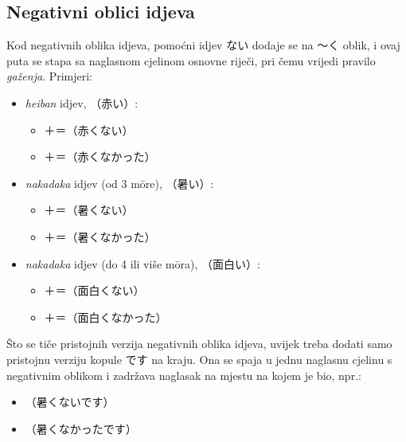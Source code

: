 \subsection{Negativni oblici idjeva}
Kod negativnih oblika idjeva, pomoćni idjev ない dodaje se na 〜く oblik, i ovaj puta se stapa sa naglasnom cjelinom osnovne riječi, pri čemu vrijedi pravilo \textit{gaženja}.
Primjeri:
\begin{itemize}
	\item \textit{heiban} idjev, （赤い）:
	\begin{itemize}
		\item {}＋＝（赤くない）
		\item {}＋＝（赤くなかった）
	\end{itemize}
	\item \textit{nakadaka} idjev (od 3 m\=ore), （暑い）:
	\begin{itemize}
		\item {}＋＝（暑くない）
		\item {}＋＝（暑くなかった）
	\end{itemize}
	\item \textit{nakadaka} idjev (do 4 ili više m\=ora), （面白い）:
	\begin{itemize}
		\item {}＋＝（面白くない）
		\item {}＋＝（面白くなかった）
	\end{itemize}
\end{itemize}

Što se tiče pristojnih verzija negativnih oblika idjeva, uvijek treba dodati samo pristojnu verziju kopule です na kraju.
Ona se spaja u jednu naglasnu cjelinu s negativnim oblikom i zadržava naglasak na mjestu na kojem je bio, npr.:
\begin{itemize}
	\item {}（暑くないです）
	\item {}（暑くなかったです）
\end{itemize}
